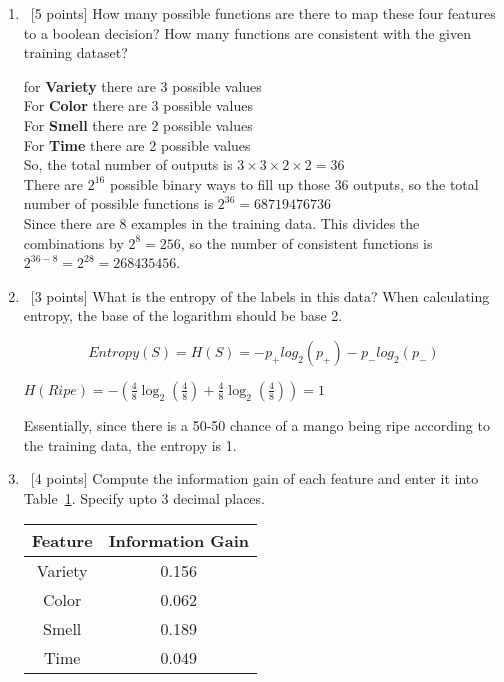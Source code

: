 \begin{enumerate}
  \begin{enumerate}
  \item~[5 points] How many possible functions are there to map these four features to a boolean decision? How many functions are consistent with the given training dataset?

  {\color{red}
    for \textbf{Variety} there are 3 possible values \\
    For \textbf{Color} there are 3 possible values \\
    For \textbf{Smell} there are 2 possible values \\
    For \textbf{Time} there are 2 possible values \\
    So, the total number of outputs is $3 \times 3 \times 2 \times 2 = 36$ \\
    There are $2^16$ possible binary ways to fill up those $36$ outputs, so the total number of possible functions is $2^{36} = 68719476736$ \\
    Since there are 8 examples in the training data. This divides the combinations by $2^8 = 256$, so the number of consistent functions is $2^{36 - 8} = 2^{28} = 268435456$.
  }

  \item~[3 points] What is the entropy of the labels in this data? When calculating entropy, the base of the logarithm should be base 2.

  {\color{red}

    \begin{equation}
      Entropy(S) = H(S) = -p_+log_2(p_+)-p_-log_2(p_-)
    \end{equation}

    $H(Ripe) = -\left(\frac{4}{8}\log_2\left(\frac{4}{8}\right) + \frac{4}{8}\log_2\left(\frac{4}{8}\right)\right) = 1$

    Essentially, since there is a 50-50 chance of a mango being ripe according to the training data, the entropy is 1.
  }

  \item~[4 points] Compute the information gain of each feature and enter it
    into Table~\ref{tb-entropy-ig}. Specify upto 3 decimal places.
    \begin{table}[h]
      \centering
      \begin{tabular}{c|c}

        \hline
        Feature & Information Gain \\ \hline
        Variety & 0.156            \\
        Color   & 0.062            \\
        Smell   & 0.189            \\
        Time    & 0.049            \\ \hline
      \end{tabular}
      \label{tb-entropy-ig}
    \end{table}


\end{enumerate}
\end{enumerate}
